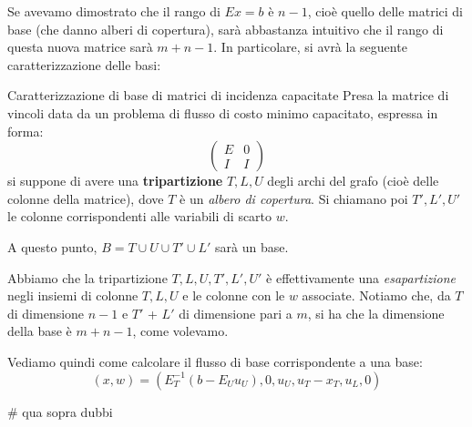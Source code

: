 \documentclass[a4paper,11pt]{article}
\begin{document}
Se avevamo dimostrato che il rango di $Ex = b$ è $n - 1$, cioè quello delle matrici di base (che danno alberi di copertura), sarà abbastanza intuitivo che il rango di questa nuova matrice sarà $m + n - 1$.
In particolare, si avrà la seguente caratterizzazione delle basi:
\begin{theorem}{Caratterizzazione di base di matrici di incidenza capacitate}
	Presa la matrice di vincoli data da un problema di flusso di costo minimo capacitato, espressa in forma:
$$
\begin{pmatrix}
	E & 0 \\ 
	I & I
\end{pmatrix}
$$
si suppone di avere una \textbf{tripartizione} $T, L, U$ degli archi del grafo (cioè delle colonne della matrice), dove $T$ è un \textit{albero di copertura}. 
Si chiamano poi $T', L', U'$ le colonne corrispondenti alle variabili di scarto $w$.

A questo punto, $B = T \cup U \cup T' \cup L'$ sarà un base. 

\end{theorem}

Abbiamo che la tripartizione $T, L, U, T', L', U'$ è effettivamente una \textit{esapartizione} negli insiemi di colonne $T, L, U$ e le colonne con le $w$ associate.
Notiamo che, da $T$ di dimensione $n-1$ e $T'$ + $L'$ di dimensione pari a $m$, si ha che la dimensione della base è $m + n - 1$, come volevamo.

Vediamo quindi come calcolare il flusso di base corrispondente a una base:
$$
(x, w) = \left( E_T^{-1} (b - E_U u_U), 0, u_U, u_T - x_T, u_L, 0 \right)
$$

# qua sopra dubbi
\end{document}
